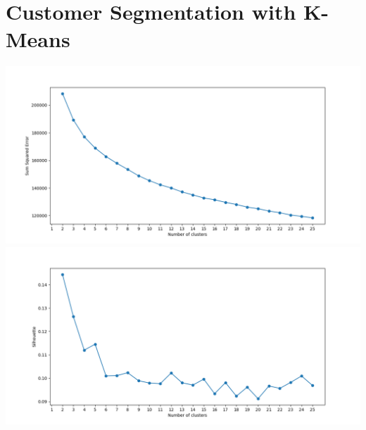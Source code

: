 \documentclass[12pt, notitlepage]{article}
\begin{document}
\section{Customer Segmentation with K-Means}
\includegraphics[scale=0.6]{kmeans_SSE.png}\\
\includegraphics[scale=0.6]{kmeans_silhouette.png}
\end{document}
